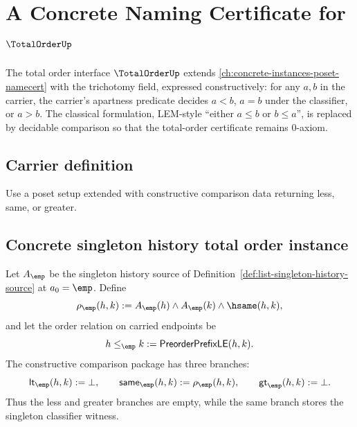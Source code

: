 \chapter{A Concrete Naming Certificate for $\TotalOrderUp$}
\label{ch:concrete-instances-totalorder-namecert}

The total order interface $\TotalOrderUp$ extends \autoref{ch:concrete-instances-poset-namecert} with the trichotomy field, expressed constructively: for any $a, b$ in the carrier, the carrier's apartness predicate decides $a < b$, $a = b$ under the classifier, or $a > b$. The classical formulation, LEM-style ``either $a \le b$ or $b \le a$'', is replaced by decidable comparison so that the total-order certificate remains 0-axiom.

\section{Carrier definition}

\begin{definition}
\label{def:totalorder-carrier}
Use a poset setup extended with constructive comparison data returning less, same, or greater.
\end{definition}

\section{Concrete singleton history total order instance}
\label{sec:totalorder-concrete-singleton-history-instance}

\begin{definition}
\label{def:concrete-singleton-history-totalorder-instance}
Let $A_{\emp}$ be the singleton history source of
Definition~\ref{def:list-singleton-history-source} at $a_0=\emp$. Define
$$
\rho_{\emp}(h,k):=
A_{\emp}(h)\land A_{\emp}(k)\land\hsame(h,k),
$$
and let the order relation on carried endpoints be
$$
h\le_{\emp}k:=\mathsf{PreorderPrefixLE}(h,k).
$$
The constructive comparison package has three branches:
$$
\mathsf{lt}_{\emp}(h,k):=\bot,\qquad
\mathsf{same}_{\emp}(h,k):=\rho_{\emp}(h,k),\qquad
\mathsf{gt}_{\emp}(h,k):=\bot.
$$
Thus the less and greater branches are empty, while the same branch stores the
singleton classifier witness.
\end{definition}

